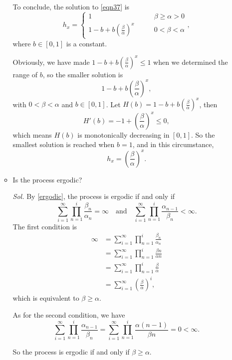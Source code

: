\begin{enumerate}
\begin{itemize}
        To conclude, the solution to \eqref{eqn37} is 
        \begin{equation*}
            h_x = \begin{cases}
                1 \qquad & \beta \ge \alpha > 0\\ 
                1 - b + b \left( \frac{\beta}{\alpha} \right)^x \qquad & 0 < \beta < \alpha
            \end{cases},
        \end{equation*}
        where $b \in [0, 1]$ is a constant.

        Obviously, we have made $1 - b + b \left( \frac{\beta}{\alpha} \right)^x \le 1$ when we determined the range of $b$, so the smaller solution is 
        $$
        1 - b + b \left( \frac{\beta}{\alpha} \right)^x,
        $$
        with $0 < \beta < \alpha$ and $b \in [0, 1]$. Let 
        $H(b) = 1 - b + b \left( \frac{\beta}{\alpha} \right)^x$, then 
        $$H'(b) = -1 + \left( \frac{\beta}{\alpha} \right)^x \le 0,$$
        which means $H(b)$ is monotonically decreasing in $[0, 1]$. So the smallest solution is reached when $b = 1$, and in this circumstance, 
        $$h_x = \left( \frac{\beta}{\alpha} \right)^x.$$

        \item Is the process ergodic?
        
        \textit{ Sol. } 
        By \eqref{ergodic}, the process is ergodic if and only if 
        \begin{equation*}
            \sum_{i=1}^\infty \prod_{n=1}^i \frac{\beta_n}{\alpha_n} = \infty \quad \text{and} \quad
            \sum_{i=1}^\infty \prod_{n=1}^i \frac{\alpha_{n-1}}{\beta_n} < \infty.
        \end{equation*}
        The first condition is 
        \begin{align*}
            \infty & = \sum_{i=1}^\infty \prod_{n=1}^i \frac{\beta_n}{\alpha_n} \\ 
            & = \sum_{i=1}^\infty \prod_{n=1}^i \frac{\beta n}{\alpha n} \\ 
            & = \sum_{i=1}^\infty \prod_{n=1}^i \frac{\beta}{\alpha} \\ 
            & = \sum_{i=1}^\infty \left( \frac{\beta}{\alpha} \right)^i,
        \end{align*}
        which is equivalent to $\beta \ge \alpha$. 

        As for the second condition, we have 
        \begin{equation*}
            \sum_{i=1}^\infty \prod_{n=1}^i \frac{\alpha_{n-1}}{\beta_n} = \sum_{i=1}^\infty \prod_{n=1}^i \frac{\alpha(n-1)}{\beta n} = 0 < \infty.
        \end{equation*}
        
        So the process is ergodic if and only if $\beta \ge \alpha$.
    \end{itemize} 
\end{enumerate}